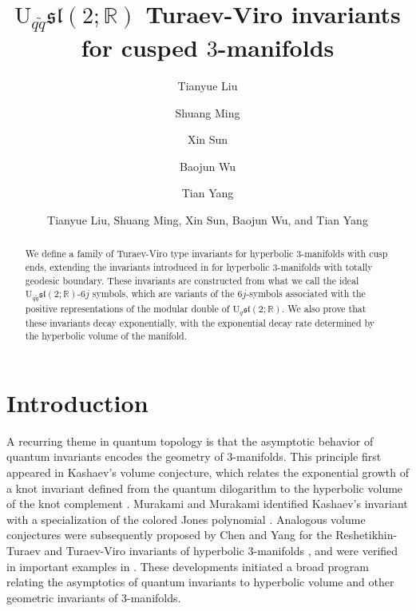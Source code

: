\documentclass[11pt]{article}
\theoremstyle{remark}
\theoremstyle{remark}
\numberwithin{equation}{section}
\begin{document}
\title{\bf $\mathrm {U}_{q\tilde q}\mathfrak{sl}(2;\mathbb R)$ Turaev-Viro invariants for cusped  $3$-manifolds}
\date{}

\author{Tianyue Liu} 
\author{Shuang Ming} 
\author{Xin Sun} %
\author{Baojun Wu}%
\author{Tian Yang}
\author{Tianyue Liu, Shuang Ming, Xin Sun, Baojun Wu, and Tian Yang} 



\maketitle



\begin{abstract} 
We define a family of Turaev-Viro type invariants for hyperbolic $3$-manifolds with cusp ends, extending the invariants introduced in \cite{LMSWY} for hyperbolic $3$-manifolds with totally geodesic boundary. These invariants are constructed from what we call the ideal $\mathrm{U}_{q\tilde q}\mathfrak{sl}(2;\mathbb R)$-$6j$ symbols, which are variants of the $6j$-symbols associated with the positive representations of the modular double of $\mathrm{U}_q\mathfrak{sl}(2;\mathbb R)$. We also prove that these invariants decay exponentially, with the exponential decay rate determined by the hyperbolic volume of the manifold.
\end{abstract}

\tableofcontents









\section{Introduction}


A recurring theme in quantum topology is that the asymptotic behavior of
quantum invariants encodes the geometry of $3$-manifolds. This principle
first appeared in Kashaev's volume conjecture, which relates the
exponential growth of a knot invariant defined from the quantum
dilogarithm to the hyperbolic volume of the knot complement
\cite{Kashaev}. Murakami and Murakami identified Kashaev's invariant
with a specialization of the colored Jones polynomial
\cite{MurakamiMurakami}. Analogous volume conjectures were subsequently
proposed by Chen and Yang for the Reshetikhin-Turaev and Turaev-Viro
invariants of hyperbolic $3$-manifolds \cite{ChenYang}, and were verified
in important examples in 
\cite{DetcherryKalfagianniYang, BDKY, O, WY}. These developments initiated a broad
program relating the asymptotics of quantum invariants to hyperbolic
volume and other geometric invariants of $3$-manifolds.
\end{document}
